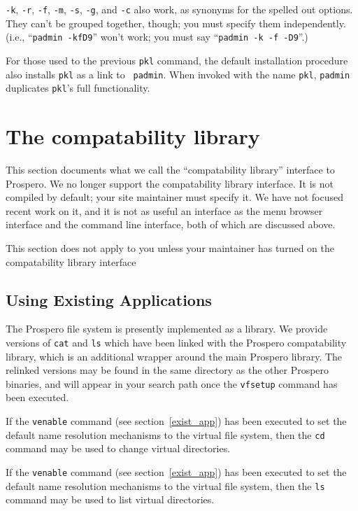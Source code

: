 {\tt -k}, {\tt -r}, {\tt -f}, {\tt -m}, {\tt -s}, {\tt -g}, and {\tt -c} also work, as synonyms for the spelled
out options.  They can't be grouped together, though; you must specify
them independently.  (i.e., ``{\tt padmin -kfD9}'' won't work; you must say
``{\tt padmin -k -f -D9}''.)

For those used to the previous {\tt pkl} command, the default
installation procedure also installs {\tt pkl} as a link to {\tt
padmin}.  When invoked with the name {\tt pkl}, {\tt padmin}
duplicates {\tt pkl}'s full functionality.

\section{The compatability library}

This section documents what we call the ``compatability library''
interface to Prospero.  We no longer support the compatability library
interface.  It is not compiled by default; your site maintainer must
specify it.  We have not focused recent work on it, and it is not as
useful an interface as the menu browser interface and the command line
interface, both of which are discussed above.

This section does not apply to you unless your maintainer has turned
on the compatability library interface

\subsection{Using Existing Applications\label{exist_app}}

The Prospero file system is presently implemented as a library.  We
provide versions of {\tt cat} and {\tt ls} which have been linked with
the Prospero compatability library, which is an additional wrapper
around the main Prospero library.  The relinked versions may be found
in the same directory as the other Prospero binaries, and will appear
in your search path once the {\tt vfsetup} command has been executed.

If the {\tt venable} command (see section~\ref{exist_app}) has been
executed to set the default name resolution mechanisms to the virtual
file system, then the {\tt cd} command may be used to change
virtual directories.

If the {\tt venable} command (see section~\ref{exist_app}) has been
executed to set the default name resolution mechanisms to the virtual
file system, then the {\tt ls} command may be used to list virtual
directories.

